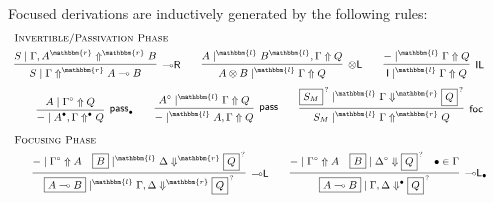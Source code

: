 \documentclass[runningheads]{llncs}
\newcommand{\tl}{\otimes \mathsf{L}}
\newcommand{\lright}{{\multimap}\mathsf{R}}
\newcommand{\lleft}{{\multimap}\mathsf{L}}
\newcommand{\pass}{\mathsf{pass}}
\newcommand{\unitl}{\mathsf{IL}}
\newcommand{\otL}{\tl}
\newcommand{\lolliR}{\lright}
\newcommand{\lolliL}{\lleft}
\newcommand{\IL}{\unitl}
\newcommand{\ot}{\otimes}
\newcommand{\lolli}{\multimap}
\newcommand{\I}{\mathsf{I}}
\newcommand{\LI}{\mathsf{LI}}
\newcommand{\Pass}{\mathsf{P}}
\newcommand{\xvdash}{\vdash^{x}}
\newcommand{\up}{\Uparrow}
\newcommand{\dn}{\Downarrow}
\newcommand{\sw}{\mathsf{sw}}
\newcommand{\focL}{\mathsf{foc_L}}
\newcommand{\foc}{\mathsf{foc}}
\newcommand{\focR}{\mathsf{foc_R}}
\newcommand{\focLR}{\mathsf{foc_{M}}}
\renewcommand{\r}{\mathbbm{r}}
\renewcommand{\l}{\mathbbm{l}}
\begin{document}
Focused derivations are inductively generated by the following rules:
\begin{equation}\label{fig:max-multifocus}\small
  \begin{array}{c}
    \multicolumn{1}{l}{\text{\textsc{Invertible/Passivation Phase}}} \\[4pt]
      \infer[\lolliR]{S \mid \Gamma \up^{\r} A \lolli B}{S \mid \Gamma , A^{\r} \up^{\r} B}
    \qquad
    \infer[\otL]{A \ot B \mid^\l \Gamma \up Q}{A \mid^\l  B^{\l} , \Gamma \up Q}
    \qquad
      \infer[\IL]{\I \mid^\l \Gamma \up Q}{- \mid^\l \Gamma \up Q}    
    \qquad
    \\[6pt]    
    \infer[\pass_\bullet]{- \mid A^{\bullet} , \Gamma \up^{\bullet} Q }{
      A\mid \Gamma^{\circ} \up Q
    }
    \qquad
    \infer[\pass]{- \mid^{\l} A , \Gamma \up Q }{
      A^\circ \mid^{\l} \Gamma \up Q
    }
    \qquad
        \infer[\foc]{S_M \mid^{\l} \Gamma \up^{\r} Q}{
      \fbox{$S_M$}^{\, ?} \mid^\l \Gamma \dn^{\r} \fbox{$Q$}^{\, ?}
    }
    \\[9pt]
    \multicolumn{1}{l}{\text{\textsc{Focusing Phase}}} \\[4pt]
    \infer[\lolliL]{\fbox{$A \lolli B$} \mid^\l \Gamma , \Delta \dn^\r \fbox{$Q$}^{\,?}}{
      - \mid \Gamma^\circ \up A
      &
      \fbox{$B$} \mid^\l \Delta \dn^\r \fbox{$Q$}^{\,?}
    }
    \qquad
    \infer[\lolliL_\bullet]{\fbox{$A \lolli B$} \mid \Gamma , \Delta \dn^\bullet \fbox{$Q$}^{\,?}}{
      - \mid \Gamma^{\circ} \up A
      &
      \fbox{$B$} \mid \Delta^{\circ} \dn \fbox{$Q$}^{\,?}
      &
      \bullet \in \Gamma
}
\end{array}
\end{equation}
\end{document}
